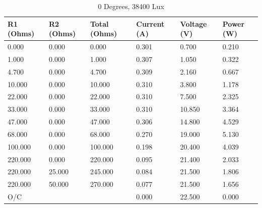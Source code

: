\documentclass{article}
\begin{document}
		\begin{table}[H]
			\centering
			\caption{0 Degrees, 38400 Lux}
			\begin{tabular}{|l|l|l|l|l|l|}
				\hline
				
				\textbf{R1 (Ohms)} & \textbf{R2 (Ohms)} & \textbf{Total (Ohms)} & \textbf{Current (A)} & \textbf{Voltage (V)} & \textbf{Power (W)} \\ \hline
				0.000 & 0.000 & 0.000 & 0.301 & 0.700 & 0.210 \\ \hline
				1.000 & 0.000 & 1.000 & 0.307 & 1.050 & 0.322 \\ \hline
				4.700 & 0.000 & 4.700 & 0.309 & 2.160 & 0.667 \\ \hline
				10.000 & 0.000 & 10.000 & 0.310 & 3.800 & 1.178 \\ \hline
				22.000 & 0.000 & 22.000 & 0.310 & 7.500 & 2.325 \\ \hline
				33.000 & 0.000 & 33.000 & 0.310 & 10.850 & 3.364 \\ \hline
				47.000 & 0.000 & 47.000 & 0.306 & 14.800 & 4.529 \\ \hline
				68.000 & 0.000 & 68.000 & 0.270 & 19.000 & 5.130 \\ \hline
				100.000 & 0.000 & 100.000 & 0.198 & 20.400 & 4.039 \\ \hline
				220.000 & 0.000 & 220.000 & 0.095 & 21.400 & 2.033 \\ \hline
				220.000 & 25.000 & 245.000 & 0.084 & 21.500 & 1.806 \\ \hline
				220.000 & 50.000 & 270.000 & 0.077 & 21.500 & 1.656 \\ \hline
				O/C & & & 0.000 & 22.500 & 0.000 \\ \hline
				
			\end{tabular}
		\end{table}
	
\end{document}
